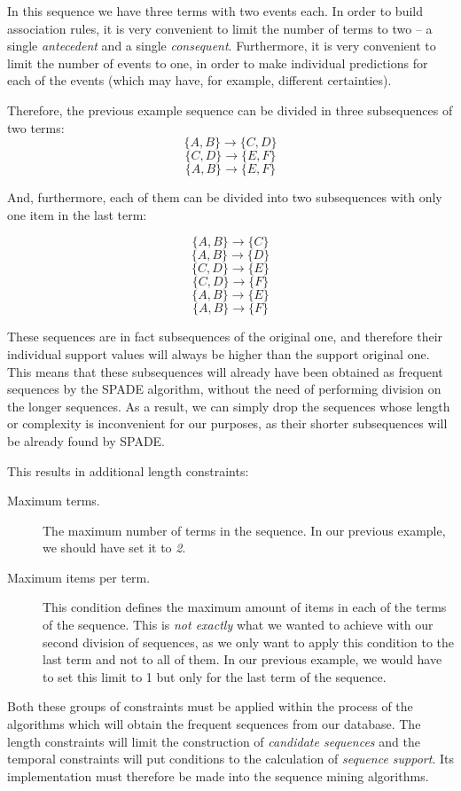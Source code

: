 \documentclass[a4paper,12pt]{article}
\begin{document}
In this sequence we have three terms with two events each. In order to build association rules, it is very convenient to limit the number of terms to two -- a single \emph{antecedent} and a single \emph{consequent}. Furthermore, it is very convenient to limit the number of events to one, in order to make individual predictions for each of the events (which may have, for example, different certainties). 

Therefore, the previous example sequence can be divided in three subsequences of two terms:
$$\{A, B\} \longrightarrow \{C, D\}$$
$$\{C, D\} \longrightarrow \{E, F\}$$
$$\{A, B\} \longrightarrow \{E, F\}$$

And, furthermore, each of them can be divided into two subsequences with only one item in the last term:

$$\{A, B\} \longrightarrow \{C\}$$
$$\{A, B\} \longrightarrow \{D\}$$
$$\{C, D\} \longrightarrow \{E\}$$
$$\{C, D\} \longrightarrow \{F\}$$
$$\{A, B\} \longrightarrow \{E\}$$
$$\{A, B\} \longrightarrow \{F\}$$

These sequences are in fact subsequences of the original one, and therefore their individual support values will always be higher than the support original one. This means that these subsequences will already have been obtained as frequent sequences by the SPADE algorithm, without the need of performing division on the longer sequences. As a result, we can simply drop the sequences whose length or complexity is inconvenient for our purposes, as their shorter subsequences will be already found by SPADE.

This results in additional length constraints:
\begin{description}
\item[Maximum terms.] The maximum number of terms in the sequence. In our previous example, we should have set it to \emph{2}.
\item[Maximum items per term.] This condition defines the maximum amount of items in each of the terms of the sequence. This is \emph{not exactly} what we wanted to achieve with our second division of sequences, as we only want to apply this condition to the last term and not to all of them. In our previous example, we would have to set this limit to 1 but only for the last term of the sequence.
\end{description}

Both these groups of constraints must be applied within the process of the algorithms which will obtain the frequent sequences from our database. The length constraints will limit the construction of \emph{candidate sequences} and the temporal constraints will put conditions to the calculation of \emph{sequence support}. Its implementation must therefore be made into the sequence mining algorithms.
\end{document}
